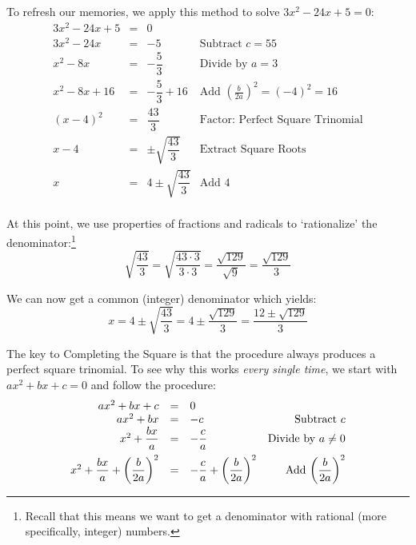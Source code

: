 \documentclass{ximera}
\begin{document}
\medskip

To refresh our memories, we apply this method to solve $3x^2 - 24x + 5 = 0$: \[ \begin{array}{rclr}

3x^2 - 24x + 5 & = & 0 & \\

3x^2 - 24x  & = & -5 & \text{Subtract  $c = 55$} \\

x^2 - 8x & = & -\dfrac{5}{3} & \text{Divide by $a = 3$} \\ [8pt]

x^2 - 8x + 16 & = & -\dfrac{5}{3} + 16 & \text{Add $\left(\frac{b}{2a}\right)^2 = (-4)^2 = 16$} \\ [8pt]

(x - 4)^2 & = & \dfrac{43}{3} & \text{Factor: Perfect Square Trinomial} \\

x - 4 & = & \pm \sqrt{\dfrac{43}{3}} & \text{Extract Square Roots} \\ [5pt]

x & = & 4 \pm \sqrt{\dfrac{43}{3}} & \text{Add $4$} \\

\end{array}\]

At this point, we use properties of fractions and radicals to `rationalize' the denominator:\footnote{Recall that this means we want to get a denominator with rational (more specifically, integer) numbers.}  \[ \sqrt{\dfrac{43}{3}} = \sqrt{\dfrac{43 \cdot 3}{3 \cdot 3}} = \dfrac{\sqrt{129}}{\sqrt{9}} = \dfrac{\sqrt{129}}{3} \]

We can now get a common (integer) denominator which yields: \[x=  4 \pm \sqrt{\dfrac{43}{3}} = 4 \pm \dfrac{\sqrt{129}}{3} = \dfrac{12 \pm \sqrt{129}}{3} \]

The key to Completing the Square is that the procedure always produces a perfect square trinomial. To see why this works \textit{every single time}, we start with $ax^2 + bx + c = 0$ and follow the procedure:\[ \begin{array}{rclr}

ax^2 + bx + c & = & 0 & \\

ax^2 + bx & = & -c & \text{Subtract $c$} \\

x^2 + \dfrac{bx}{a} & = & -\dfrac{c}{a} & \text{Divide by $a \neq 0$} \\ [8pt]

x^2 + \dfrac{bx}{a} + \left(\dfrac{b}{2a}\right)^2 & = & -\dfrac{c}{a} + \left(\dfrac{b}{2a}\right)^2 & \text{Add $ \left(\dfrac{b}{2a}\right)^2$} \\

\end{array} \]
\end{document}
